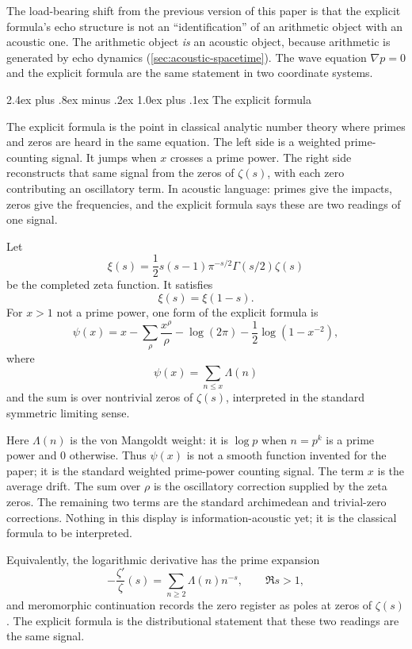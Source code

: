 \documentclass[11pt,a4paper]{article}
\makeatletter
\theoremstyle{plain}
\theoremstyle{definition}
\theoremstyle{remark}
\numberwithin{equation}{section}
\renewcommand{\subsection}{%
  \@startsection{subsection}{2}{0pt}%
    {2.4ex plus .8ex minus .2ex}%
    {1.0ex plus .1ex}%
    {\normalfont\Large\bfseries\color{headingAccent}}%
}
\makeatother
\begin{document}
The load-bearing shift from the previous version of this paper is
that the explicit formula's echo structure is not an
``identification'' of an arithmetic object with an acoustic one.
The arithmetic object \emph{is} an acoustic object, because
arithmetic is generated by echo dynamics
(\cref{sec:acoustic-spacetime}).  The wave equation \(\nabla p=0\)
and the explicit formula are the same
statement in two coordinate systems.

\subsection{The explicit formula}

The explicit formula is the point in classical analytic number theory
where primes and zeros are heard in the same equation.  The left side is
a weighted prime-counting signal.  It jumps when \(x\) crosses a prime
power.  The right side reconstructs that same signal from the zeros of
\(\zeta(s)\), with each zero contributing an oscillatory term.  In
acoustic language: primes give the impacts, zeros give the frequencies,
and the explicit formula says these are two readings of one signal.

Let
\[
  \xi(s)=\frac12s(s-1)\pi^{-s/2}\Gamma(s/2)\zeta(s)
\]
be the completed zeta function.  It satisfies
\[
  \xi(s)=\xi(1-s).
\]
For \(x>1\) not a prime power, one form of the explicit formula is
\begin{equation}
  \psi(x)
  =
  x-\sum_{\rho}\frac{x^\rho}{\rho}
  -\log(2\pi)
  -\frac12\log(1-x^{-2}),
  \label{eq:explicit-formula}
\end{equation}
where
\[
  \psi(x)=\sum_{n\le x}\Lambda(n)
\]
and the sum is over nontrivial zeros of \(\zeta(s)\), interpreted in the
standard symmetric limiting sense.

Here \(\Lambda(n)\) is the von Mangoldt weight: it is \(\log p\) when
\(n=p^k\) is a prime power and \(0\) otherwise.  Thus \(\psi(x)\) is not
a smooth function invented for the paper; it is the standard weighted
prime-power counting signal.  The term \(x\) is the average drift.  The
sum over \(\rho\) is the oscillatory correction supplied by the zeta
zeros.  The remaining two terms are the standard archimedean and
trivial-zero corrections.  Nothing in this display is
information-acoustic yet; it is the classical formula to be interpreted.

Equivalently, the logarithmic derivative has the prime expansion
\begin{equation}
  -\frac{\zeta'}{\zeta}(s)
  =
  \sum_{n\ge2}\Lambda(n)n^{-s},
  \qquad \Re s>1,
  \label{eq:prime-register}
\end{equation}
and meromorphic continuation records the zero register as poles at
zeros of \(\zeta(s)\).  The explicit formula is the distributional
statement that these two readings are the same signal.
\end{document}
